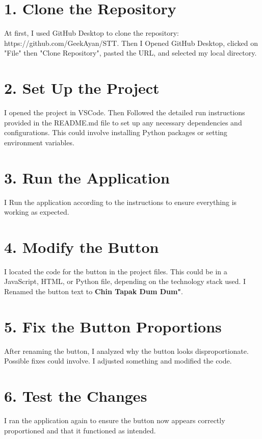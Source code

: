 \documentclass[12pt, a4paper]{article}
\begin{document}
\section*{ 1. Clone the Repository}
At first, I used GitHub Desktop to clone the repository: https://github.com/GeekAyan/STT.
Then I Opened GitHub Desktop, clicked on "File" then "Clone Repository", pasted the URL, and selected my local directory.

\section*{  2. Set Up the Project}
I opened the project in VSCode.
Then Followed the detailed run instructions provided in the README.md file to set up any necessary dependencies and configurations. This could involve installing Python packages or setting environment variables.

\section*{ 3. Run the Application}
I Run the application according to the instructions to ensure everything is working as expected.

\section*{ 4. Modify the Button}
I located the code for the button in the project files. This could be in a JavaScript, HTML, or Python file, depending on the technology stack used.
I Renamed the button text to \textbf{Chin Tapak Dum Dum"}.
  
\section*{ 5. Fix the Button Proportions}
After renaming the button, I analyzed why the button looks disproportionate. Possible fixes could involve. I adjusted something and modified the code.
\newpage
{}
\vspace{-2cm}
\section*{ 6. Test the Changes}
I ran the application again to ensure the button now appears correctly proportioned and that it functioned as intended.
\end{document}
